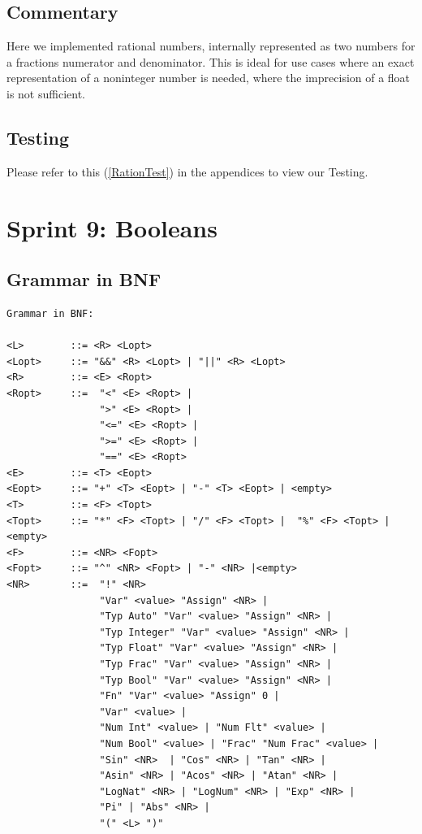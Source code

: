 \documentclass[a4paper, oneside, 11pt]{report}
\begin{document}
\subsection{Commentary}
Here we implemented rational numbers, internally represented as two numbers for a fractions numerator and denominator. This is ideal for use cases where an exact representation of a noninteger number is needed, where the imprecision of a float is not sufficient.

\subsection{Testing}
Please refer to this (\ref{RationTest}) in the appendices to view our Testing. \\


\clearpage
\section{Sprint 9: Booleans }
\subsection{Grammar in BNF}
\begin{verbatim}
Grammar in BNF:

<L>        ::= <R> <Lopt>
<Lopt>     ::= "&&" <R> <Lopt> | "||" <R> <Lopt> 
<R>        ::= <E> <Ropt>
<Ropt>     ::=  "<" <E> <Ropt> | 
                ">" <E> <Ropt> |  
                "<=" <E> <Ropt> | 
                ">=" <E> <Ropt> |
                "==" <E> <Ropt>
<E>        ::= <T> <Eopt>
<Eopt>     ::= "+" <T> <Eopt> | "-" <T> <Eopt> | <empty>
<T>        ::= <F> <Topt>
<Topt>     ::= "*" <F> <Topt> | "/" <F> <Topt> |  "%" <F> <Topt> |<empty>
<F>        ::= <NR> <Fopt>
<Fopt>     ::= "^" <NR> <Fopt> | "-" <NR> |<empty> 
<NR>       ::=  "!" <NR>
                "Var" <value> "Assign" <NR> |
                "Typ Auto" "Var" <value> "Assign" <NR> |
                "Typ Integer" "Var" <value> "Assign" <NR> |
                "Typ Float" "Var" <value> "Assign" <NR> |
                "Typ Frac" "Var" <value> "Assign" <NR> |
                "Typ Bool" "Var" <value> "Assign" <NR> |
                "Fn" "Var" <value> "Assign" 0 |
                "Var" <value> |
                "Num Int" <value> | "Num Flt" <value> |
                "Num Bool" <value> | "Frac" "Num Frac" <value> |
                "Sin" <NR>  | "Cos" <NR> | "Tan" <NR> |
                "Asin" <NR> | "Acos" <NR> | "Atan" <NR> |
                "LogNat" <NR> | "LogNum" <NR> | "Exp" <NR> |
                "Pi" | "Abs" <NR> |
                "(" <L> ")"
\end{verbatim}
\end{document}
